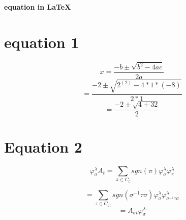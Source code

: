 \documentclass[10pt,a4paper]{article}
\begin{document}
\begin{center}
    \Large{\textbf{equation in \LaTeX}}
\end{center}
\section*{equation 1}
\begin{fleqn}
\[
x=\frac{-b\pm \sqrt{b^{2}-4ac}}{2a}
\]
\[
=\frac{-2\pm \sqrt{2^(2)-4*1*(-8)}}{2*1}
\]
\[
=\frac{-2\pm \sqrt{4+32}}{2}
\]
\end{fleqn}
\section*{Equation 2}
\begin{fleqn}
    \[
    \varphi^{\lambda}_{\sigma}A_{t}=\sum_{\pi \in C_{t}}sgn(\pi)\varphi^{\lambda}_{\sigma}\varphi^{\lambda}_{\pi}
    \]

    \[
    =\sum_{\tau \in C_{\sigma t}} sgn(\sigma^{-1}\tau\sigma)\varphi^{\lambda}_{\sigma}\varphi^{\lambda}_{\sigma^{-1}\tau\sigma}
    \]
    \[
    =A_{\sigma t}\varphi^{\lambda}_{\sigma}
    \]
\end{fleqn}
\end{document}
